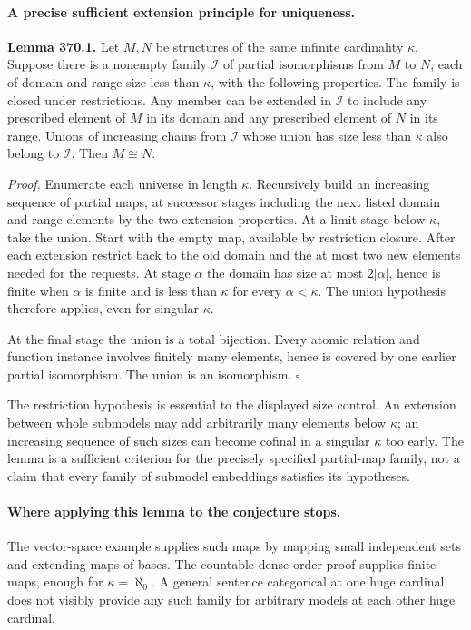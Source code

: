\documentclass[11pt]{article}
\begin{document}
\paragraph{A precise sufficient extension principle for uniqueness.}
\textbf{Lemma 370.1.} Let $M,N$ be structures of the same infinite
cardinality $\kappa$. Suppose there is a nonempty family $\mathcal I$
of partial isomorphisms from $M$ to $N$, each of domain and range size
less than $\kappa$, with the following properties. The family is closed under restrictions.
Any member can be
extended in $\mathcal I$ to include any prescribed element of $M$
in its domain and any prescribed element of $N$ in its range. Unions
of increasing chains from $\mathcal I$ whose union has size less than
$\kappa$ also belong to $\mathcal I$. Then $M\cong N$.

\emph{Proof.} Enumerate each universe in length $\kappa$. Recursively
build an increasing sequence of partial maps, at successor stages
including the next listed domain and range elements by the two extension
properties. At a limit stage below $\kappa$, take the union.
Start with the empty map, available by restriction closure. After each
extension restrict back to the old domain and the at most two new
elements needed for the requests. At stage $\alpha$ the domain has
size at most $2|\alpha|$, hence is finite when $\alpha$ is finite
and is less than $\kappa$ for every $\alpha<\kappa$. The union
hypothesis therefore applies, even for singular $\kappa$.

At the final stage the union is a total bijection. Every atomic relation
and function instance involves finitely many elements, hence is covered
by one earlier partial isomorphism. The union is an isomorphism.
\hfill$\square$

The restriction hypothesis is essential to the displayed size control.
An extension between whole submodels may add arbitrarily many elements
below $\kappa$; an increasing sequence of such sizes can become
cofinal in a singular $\kappa$ too early. The lemma is a sufficient
criterion for the precisely specified partial-map family, not a claim
that every family of submodel embeddings satisfies its hypotheses.

\paragraph{Where applying this lemma to the conjecture stops.}
The vector-space example supplies such maps by mapping small independent
sets and extending maps of bases. The countable dense-order proof
supplies finite maps, enough for $\kappa=\aleph_0$. A general sentence
categorical at one huge cardinal does not visibly provide any such
family for arbitrary models at each other huge cardinal.
\end{document}
